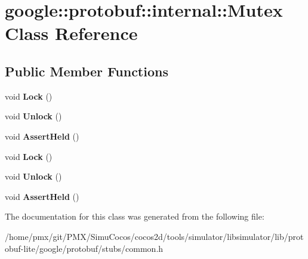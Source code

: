 \hypertarget{classgoogle_1_1protobuf_1_1internal_1_1Mutex}{}\section{google\+:\+:protobuf\+:\+:internal\+:\+:Mutex Class Reference}
\label{classgoogle_1_1protobuf_1_1internal_1_1Mutex}
\subsection*{Public Member Functions}
\begin{DoxyCompactItemize}
\item 
\mbox{\label{classgoogle_1_1protobuf_1_1internal_1_1Mutex_a7c50e38325f8da42bf5a2592e87ba1f9}} 
void {\bfseries Lock} ()
\item 
\mbox{\label{classgoogle_1_1protobuf_1_1internal_1_1Mutex_a7538557a4ac33d37a45278d92fce953c}} 
void {\bfseries Unlock} ()
\item 
\mbox{\label{classgoogle_1_1protobuf_1_1internal_1_1Mutex_a1d412ac2c958948b04059bc948f0e267}} 
void {\bfseries Assert\+Held} ()
\item 
\mbox{\label{classgoogle_1_1protobuf_1_1internal_1_1Mutex_a7c50e38325f8da42bf5a2592e87ba1f9}} 
void {\bfseries Lock} ()
\item 
\mbox{\label{classgoogle_1_1protobuf_1_1internal_1_1Mutex_a7538557a4ac33d37a45278d92fce953c}} 
void {\bfseries Unlock} ()
\item 
\mbox{\label{classgoogle_1_1protobuf_1_1internal_1_1Mutex_a1d412ac2c958948b04059bc948f0e267}} 
void {\bfseries Assert\+Held} ()
\end{DoxyCompactItemize}


The documentation for this class was generated from the following file\+:\begin{DoxyCompactItemize}
\item 
/home/pmx/git/\+P\+M\+X/\+Simu\+Cocos/cocos2d/tools/simulator/libsimulator/lib/protobuf-\/lite/google/protobuf/stubs/common.\+h\end{DoxyCompactItemize}
